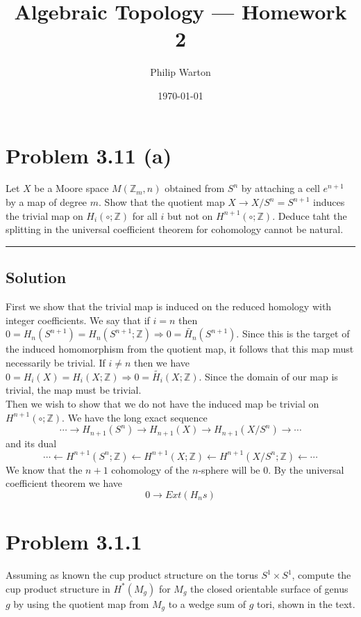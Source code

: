 \documentclass{article}
\theoremstyle{definition}
\begin{document}
\title{Algebraic Topology --- Homework 2}
\author{Philip Warton}
\date{\today}
\maketitle
\section*{Problem 3.11 (a)}
Let $X$ be a Moore space $M(\mathbb{Z}_m,n)$ obtained from $S^n$ by attaching a cell $e^{n+1}$ by a map of degree $m$.
Show that the quotient map $X \to X / S^n = S^{n+1}$ induces the trivial map on $H_i(\circ;\mathbb{Z})$ for all $i$ but not on $H^{n+1}(\circ ; \mathbb{Z})$.
Deduce taht the splitting in the universal coefficient theorem for cohomology cannot be natural.
\\
\par\noindent\rule{\textwidth}{0.4pt}
\subsection*{Solution}
First we show that the trivial map is induced on the reduced homology with integer coefficients.
We say that if $i = n$ then $0 = H_n(S^{n+1}) = H_n(S^{n+1};\mathbb{Z}) \Rightarrow 0 = \tilde{H_n}(S^{n+1})$.
Since this is the target of the induced homomorphism from the quotient map, it follows that this map must necessarily be trivial.
If $i \neq n$ then we have $0 = H_i(X) = H_i(X;\mathbb{Z}) \Rightarrow 0 = \tilde{H_i}(X;\mathbb{Z})$.
Since the domain of our map is trivial, the map must be trivial.\\
Then we wish to show that we do not have the induced map be trivial on $H^{n+1}(\circ ; \mathbb{Z})$.
We have the long exact sequence
\[
    \cdots \to {H}_{n+1}(S^n) \to {H}_{n+1}(X) \to {H}_{n+1}(X / S^n) \to \cdots
\]
and its dual 
\[
    \cdots \leftarrow {H}^{n+1}(S^n;\mathbb{Z}) \leftarrow {H}^{n+1}(X;\mathbb{Z}) \leftarrow {H}^{n+1}(X / S^n;\mathbb{Z}) \leftarrow \cdots  
\]
We know that the $n+1$ cohomology of the $n$-sphere will be 0. By the universal coefficient theorem we have 
\[
    0 \to Ext(H_ns)  
\]
\section*{Problem 3.1.1}
Assuming as known the cup product structure on the torus $S^1 \times S^1$, compute the cup 
product structure in $H^*(M_g)$ for $M_g$ the closed orientable surface of genus $g$ by using the quotient map 
from $M_g$ to a wedge sum of $g$ tori, shown in the text.
\end{document}
